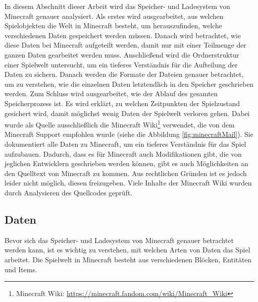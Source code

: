 In diesem Abschnitt dieser Arbeit wird das Speicher- und Ladesystem von Minecraft genauer analysiert. Als erstes wird ausgearbeitet, aus welchen Spielobjekten die Welt in Minecraft besteht, um herauszufinden, welche verschiedenen Daten gespeichert werden müssen. Danach wird betrachtet, wie diese Daten bei Minecraft aufgeteilt werden, damit nur mit einer Teilmenge der ganzen Daten gearbeitet werden muss. Anschließend wird die Ordnerstruktur einer Spielwelt untersucht, um ein tieferes Verständnis für die Aufteilung der Daten zu sichern. Danach werden die Formate der Dateien genauer betrachtet, um zu verstehen, wie die einzelnen Daten letztendlich in den Speicher geschrieben werden. Zum Schluss wird ausgearbeitet, wie der Ablauf des gesamten Speicherprozess ist. Es wird erklärt, zu welchen Zeitpunkten der Spielzustand gesichert wird, damit möglichst wenig Daten der Spielwelt verloren gehen. Dabei wurde als Quelle ausschließlich die Minecraft Wiki\footnote{ Minecraft Wiki: \url{https://minecraft.fandom.com/wiki/Minecraft_Wiki}} verwendet, die von dem Minecraft Support empfohlen wurde (siehe die Abbildung \ref{fig:minecraftMail}). Sie dokumentiert alle Daten zu Minecraft, um ein tieferes Verständnis für das Spiel aufzubauen. Dadurch, dass es für Minecraft auch Modifikationen gibt, die von jeglichen Entwicklern geschrieben werden können, gibt es auch Möglichkeiten an den Quelltext von Minecraft zu kommen. Aus rechtlichen Gründen ist es jedoch leider nicht möglich, diesen freizugeben. Viele Inhalte der Minecraft Wiki wurden durch Analysieren des Quellcodes geprüft.



\subsection{Daten}
Bevor sich das Speicher- und Ladesystem von Minecraft genauer betrachtet werden kann, ist es wichtig zu verstehen, mit welchen Arten von Daten das Spiel arbeitet. Die Spielwelt in Minecraft besteht aus verschiedenen Blöcken, Entitäten und Items. 

